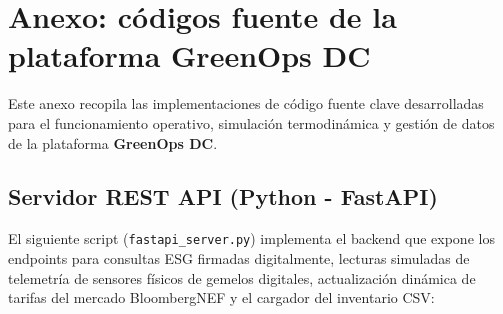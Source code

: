 \chapter{Anexo: c\'odigos fuente de la plataforma GreenOps DC}
\label{chap:anexo_codigos}

Este anexo recopila las implementaciones de c\'odigo fuente clave desarrolladas para el funcionamiento operativo, simulaci\'on termodin\'amica y gesti\'on de datos de la plataforma \textbf{GreenOps DC}.


\section{Servidor REST API (Python - FastAPI)}
El siguiente script (\texttt{fastapi\_server.py}) implementa el backend que expone los endpoints para consultas ESG firmadas digitalmente, lecturas simuladas de telemetr\'ia de sensores f\'isicos de gemelos digitales, actualizaci\'on din\'amica de tarifas del mercado BloombergNEF y el cargador del inventario CSV:

